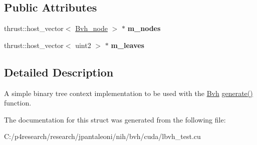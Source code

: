 \subsection*{\-Public \-Attributes}
\begin{DoxyCompactItemize}
\item 
\hypertarget{structnih_1_1_l_b_v_h__context_a471f8ec4763729d152747997e8ae36a9}{
thrust\-::host\-\_\-vector$<$ \hyperlink{structnih_1_1_bvh__node}{\-Bvh\-\_\-node} $>$ $\ast$ {\bfseries m\-\_\-nodes}}
\label{structnih_1_1_l_b_v_h__context_a471f8ec4763729d152747997e8ae36a9}

\item 
\hypertarget{structnih_1_1_l_b_v_h__context_a80852ddca3266f1e00581c7b9ea83588}{
thrust\-::host\-\_\-vector$<$ uint2 $>$ $\ast$ {\bfseries m\-\_\-leaves}}
\label{structnih_1_1_l_b_v_h__context_a80852ddca3266f1e00581c7b9ea83588}

\end{DoxyCompactItemize}


\subsection{\-Detailed \-Description}
\-A simple binary tree context implementation to be used with the \hyperlink{structnih_1_1_bvh}{\-Bvh} \hyperlink{group__bintree_gad76a50ae08ab4d525f748a7cbcc0fb6e}{generate()} function. 

\-The documentation for this struct was generated from the following file\-:\begin{DoxyCompactItemize}
\item 
\-C\-:/p4research/research/jpantaleoni/nih/bvh/cuda/lbvh\-\_\-test.\-cu\end{DoxyCompactItemize}
